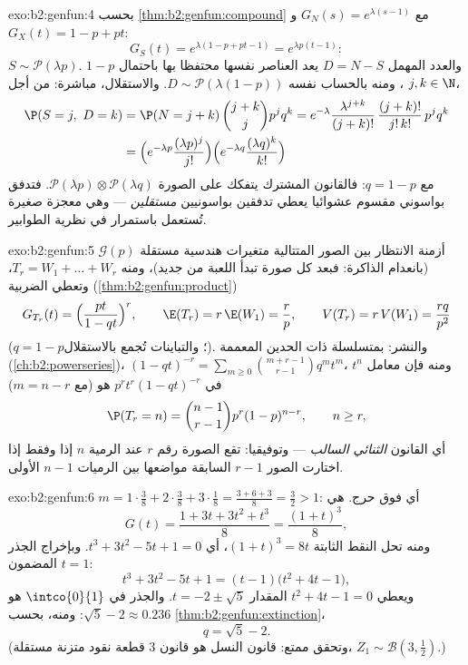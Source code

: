 \begin{solution}{exo:b2:genfun:4}
بحسب \cref{thm:b2:genfun:compound} مع $G_N(s) = e^{\lambda(s-1)}$ و$G_X(t) = 1 - p + pt$:
\[
G_S(t) = e^{\lambda(1 - p + pt - 1)} = e^{\lambda p(t - 1)} :
\]
$S \sim \mathcal{P}(\lambda p)$. والعدد المهمل $D = N - S$ يعد العناصر نفسها محتفظا بها باحتمال
$1 - p$، ومنه بالحساب نفسه $D \sim \mathcal{P}(\lambda(1 - p))$.
والاستقلال، مباشرة: من أجل $j, k \in \N$،
\begin{align*}
\P(S = j,\ D = k)
&= \P(N = j + k)\,\binom{j+k}{j}p^jq^k
= e^{-\lambda}\frac{\lambda^{j+k}}{(j+k)!}\,
\frac{(j+k)!}{j!\,k!}\,p^jq^k\\
&= \Bigl(e^{-\lambda p}\frac{(\lambda p)^j}{j!}\Bigr)
\Bigl(e^{-\lambda q}\frac{(\lambda q)^k}{k!}\Bigr)
\end{align*}
مع $q = 1 - p$: فالقانون المشترك يتفكك على الصورة $\mathcal{P}(\lambda p) \otimes \mathcal{P}(\lambda q)$. فتدفق بواسوني
مقسوم عشوائيا يعطي تدفقين بواسونيين \emph{مستقلين} --- وهي معجزة
صغيرة تُستعمل باستمرار في نظرية الطوابير.
\end{solution}

\begin{solution}{exo:b2:genfun:5}
أزمنة الانتظار بين الصور المتتالية متغيرات هندسية مستقلة $\mathcal{G}(p)$
(بانعدام الذاكرة: فبعد كل صورة تبدأ اللعبة من جديد)، ومنه $T_r = W_1 + \dots + W_r$،
وتعطي الضربية (\cref{thm:b2:genfun:product})
\[
G_{T_r}(t) = \Bigl(\frac{pt}{1 - qt}\Bigr)^{r},
\qquad
\E(T_r) = r\,\E(W_1) = \frac rp,
\qquad
V(T_r) = r\,V(W_1) = \frac{rq}{p^2}
\]
($q = 1 - p$؛ والتباينات تُجمع بالاستقلال). والنشر: بمتسلسلة ذات الحدين
المعممة (\cref{ch:b2:powerseries})، $(1 - qt)^{-r} = \sum_{m\geq0}
\binom{m + r - 1}{r - 1}q^mt^m$، ومنه فإن معامل $t^n$ في $p^rt^r(1 - qt)^{-r}$ هو (مع
$m = n - r$)
\[
\P(T_r = n) = \binom{n-1}{r-1}p^r(1-p)^{n-r},
\qquad n \geq r ,
\]
أي القانون \emph{الثنائي السالب} --- وتوفيقيا: تقع الصورة رقم $r$
عند الرمية $n$ إذا وفقط إذا اختارت الصور $r - 1$ السابقة مواضعها
بين الرميات $n - 1$ الأولى.
\end{solution}

\begin{solution}{exo:b2:genfun:6}
$m = 1\cdot\frac38 + 2\cdot\frac38 + 3\cdot\frac18 = \frac{3 + 6 +
3}{8} = \frac32 > 1$: أي فوق حرج.  هي
\[
G(t) = \frac{1 + 3t + 3t^2 + t^3}{8} = \frac{(1 + t)^3}{8} ,
\]
ومنه تحل النقط الثابتة $(1 + t)^3 = 8t$، أي $t^3 + 3t^2 - 5t + 1
= 0$. وبإخراج الجذر المضمون
$t = 1$:
\[
t^3 + 3t^2 - 5t + 1 = (t - 1)\bigl(t^2 + 4t - 1\bigr),
\]
ويعطي $t^2 + 4t - 1 = 0$ المقدار $t = -2 \pm \sqrt5$. والجذر في $\intco{0}{1}$ هو $\sqrt5 - 2 \approx 0.236$: ومنه، بحسب
\cref{thm:b2:genfun:extinction}،
\[
q = \sqrt 5 - 2 .
\]
(وتحقق ممتع: قانون النسل هو قانون $3$ قطعة نقود متزنة مستقلة،
$Z_1 \sim \mathcal{B}(3, \frac12)$.)
\end{solution}

